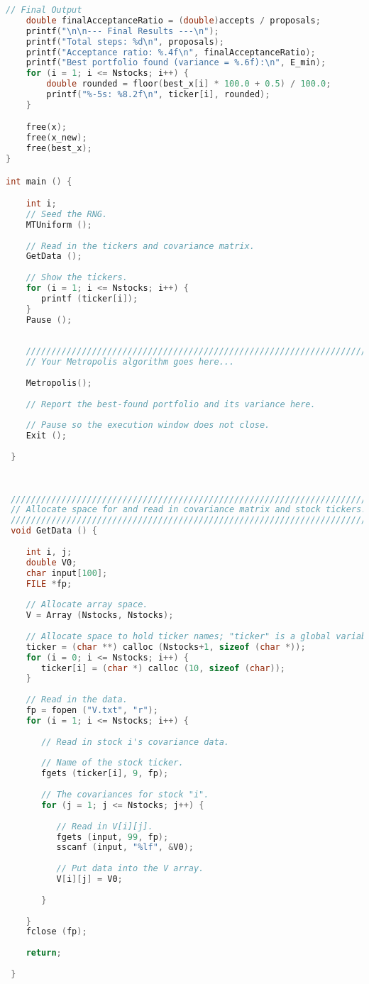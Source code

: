 \documentclass{report}
\begin{document}
\begin{lstlisting}[language=c++]
    // Final Output
    double finalAcceptanceRatio = (double)accepts / proposals;
    printf("\n\n--- Final Results ---\n");
    printf("Total steps: %d\n", proposals);
    printf("Acceptance ratio: %.4f\n", finalAcceptanceRatio);
    printf("Best portfolio found (variance = %.6f):\n", E_min);
    for (i = 1; i <= Nstocks; i++) {
        double rounded = floor(best_x[i] * 100.0 + 0.5) / 100.0;
        printf("%-5s: %8.2f\n", ticker[i], rounded);
    }

    free(x);
    free(x_new);
    free(best_x);
}

int main () {

    int i;
    // Seed the RNG.
    MTUniform ();
 
    // Read in the tickers and covariance matrix.
    GetData ();
 
    // Show the tickers.
    for (i = 1; i <= Nstocks; i++) {
       printf (ticker[i]);
    }
    Pause ();
 
 
    /////////////////////////////////////////////////////////////////////////////
    // Your Metropolis algorithm goes here...
 
    Metropolis();
 
    // Report the best-found portfolio and its variance here.
 
    // Pause so the execution window does not close.
    Exit ();
 
 }
 
 
 
 ////////////////////////////////////////////////////////////////////////////////
 // Allocate space for and read in covariance matrix and stock tickers.
 ////////////////////////////////////////////////////////////////////////////////
 void GetData () {
 
    int i, j;
    double V0;
    char input[100];
    FILE *fp;
 
    // Allocate array space.
    V = Array (Nstocks, Nstocks);
 
    // Allocate space to hold ticker names; "ticker" is a global variable.
    ticker = (char **) calloc (Nstocks+1, sizeof (char *));
    for (i = 0; i <= Nstocks; i++) {
       ticker[i] = (char *) calloc (10, sizeof (char));
    }
 
    // Read in the data.
    fp = fopen ("V.txt", "r");
    for (i = 1; i <= Nstocks; i++) {
 
       // Read in stock i's covariance data.
 
       // Name of the stock ticker.
       fgets (ticker[i], 9, fp);
 
       // The covariances for stock "i".
       for (j = 1; j <= Nstocks; j++) {
 
          // Read in V[i][j].
          fgets (input, 99, fp);
          sscanf (input, "%lf", &V0);
 
          // Put data into the V array.
          V[i][j] = V0;
 
       }
 
    }
    fclose (fp);
 
    return;
 
 }
\end{lstlisting}
\pagebreak
\end{document}
